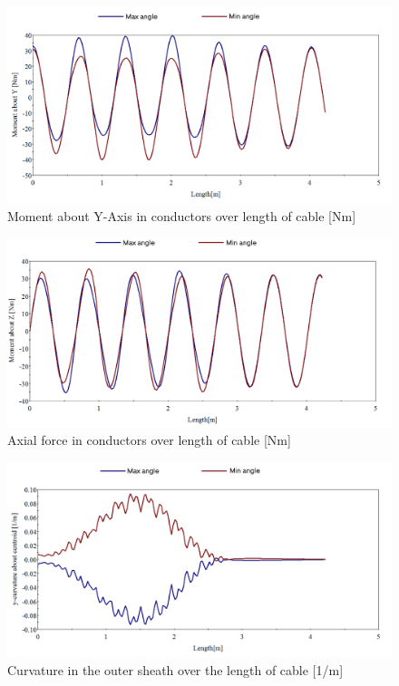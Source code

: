 \begin{figure}[H]
\centering
\includegraphics[scale=0.4]{figures/bflexmy}
\caption[$\; \:$Moment about Y-Axis in conductors]{Moment about Y-Axis in conductors over length of cable [Nm]}
 \label{fig:bflexmy}
\end{figure}

\begin{figure}[H]
\centering
\includegraphics[scale=0.4]{figures/bflexmz}
\caption[$\; \:$Axial force in conductors]{Axial force in conductors over length of cable [Nm]}
 \label{fig:bflexmz}
\end{figure}

\begin{figure}[H]
\centering
\includegraphics[scale=0.4]{figures/bflexcurve}
\caption[$\; \:$Curvature in outer sheath]{Curvature in the outer sheath over the length of cable [1/m]}
 \label{fig:bflexcurve}
\end{figure}

